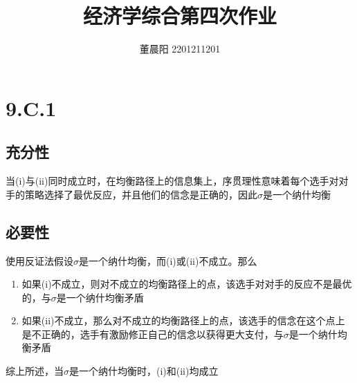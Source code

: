 \documentclass[a4paper,12pt]{ctexart}
\title{经济学综合第四次作业}
\author{董晨阳 2201211201}
\begin{document}
\maketitle
\section*{9.C.1}
\subsection{充分性}
当(i)与(ii)同时成立时，在均衡路径上的信息集上，序贯理性意味着每个选手对对手的策略选择了最优反应，并且他们的信念是正确的，因此$\sigma$是一个纳什均衡
\subsection{必要性}
使用反证法假设$\sigma$是一个纳什均衡，而(i)或(ii)不成立。那么
\begin{enumerate}
    \item 如果(i)不成立，则对不成立的均衡路径上的点，该选手对对手的反应不是最优的，与$\sigma$是一个纳什均衡矛盾
    \item 如果(ii)不成立，那么对不成立的均衡路径上的点，该选手的信念在这个点上是不正确的，选手有激励修正自己的信念以获得更大支付，与$\sigma$是一个纳什均衡矛盾
\end{enumerate}
综上所述，当$\sigma$是一个纳什均衡时，(i)和(ii)均成立
\end{document}
